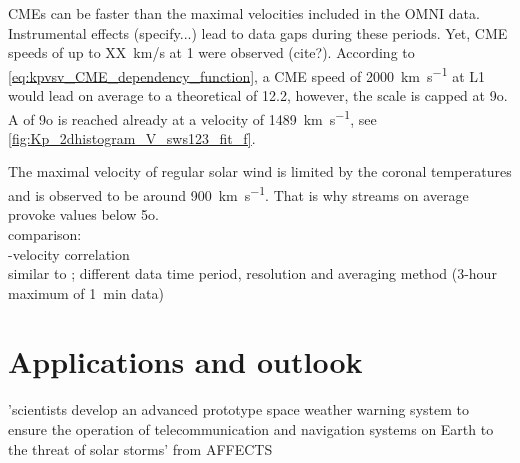 CMEs can be faster than the maximal velocities included in the OMNI data. Instrumental effects (specify...) lead to data gaps during these periods. Yet, CME speeds of up to XX~km/s at \SI{1}{\au} were observed (cite?). According to \autoref{eq:kpvsv_CME_dependency_function}, a CME speed of \SI{2000}{\km\per\s} at L1 would lead on average to a theoretical \Kp{} of 12.2, however, the \Kp{} scale is capped at 9o. A \Kp{} of 9o is reached already at a velocity of \SI{1489}{\km\per\s}, see \autoref{fig:Kp_2dhistogram_V_sws123_fit_f}.
\begin{figure}
\end{figure}

The maximal velocity of regular solar wind is limited by the coronal temperatures \citep{Parker1958} and is observed to be around \SI{900}{\km\per\s}. That is why streams on average provoke \Kp{} values below 5o.\\

comparison:\\
\Kp-velocity correlation\\
similar to \citet{Elliott2013}; different data time period, resolution and averaging method (3-hour maximum of 1~min data)\\


\section{Applications and outlook}

'scientists develop an advanced prototype space weather warning system to ensure the operation of telecommunication and navigation systems on Earth to the threat of solar storms' from AFFECTS\\

